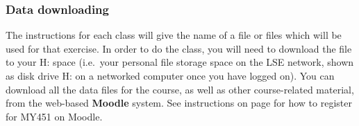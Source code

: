 \subsubsection{Data downloading}

The instructions for each class will give the name of a file or files
which will be used for that exercise.  In order to do the class,
you will need to download the file to your H: space (i.e.\ your
personal file storage space on the LSE network, shown as disk drive H:
on a networked computer once you have logged on). You can download all
the data files for the course, as well as other course-related material,
from the web-based \textbf{Moodle} system. See instructions on page
\pageref{sss_moodle} for how to register for MY451 on Moodle.





%

